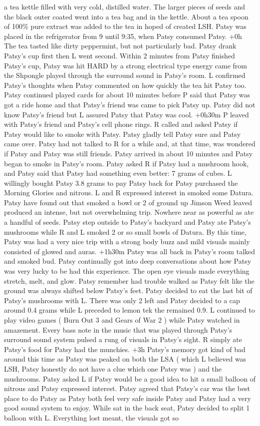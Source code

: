 \documentclass[12pt]{book}
\begin{document}
a tea kettle filled with very cold, distilled water. The larger pieces of seeds and the black outer coated went into a tea bag and in the kettle. About a tea spoon of 100\% pure extract was added to the tea in hoped of created LSH. Patsy was placed in the refrigerator from 9 until 9:35, when Patsy consumed Patsy. +0h The tea tasted like dirty peppermint, but not particularly bad. Patsy drank Patsy's cup first then L went second. Within 2 minutes from Patsy finished Patsy's cup, Patsy was hit HARD by a strong electrical type energy came from the Shpongle played through the surround sound in Patsy's room. L confirmed Patsy's thoughts when Patsy commented on how quickly the tea hit Patsy too. Patsy continued played cards for about 10 minutes before P said that Patsy was got a ride home and that Patsy's friend was came to pick Patsy up. Patsy did not know Patsy's friend but L assured Patsy that Patsy was cool. +0h30m P leaved with Patsy's friend and Patsy's cell phone rings. R called and asked Patsy if Patsy would like to smoke with Patsy. Patsy gladly tell Patsy sure and Patsy came over. Patsy had not talked to R for a while and, at that time, was wondered if Patsy and Patsy was still friends. Patsy arrived in about 10 minutes and Patsy began to smoke in Patsy's room. Patsy asked R if Patsy had a mushroom hook, and Patsy said that Patsy had something even better: 7 grams of cubes. L willingly bought Patsy 3.8 grams to pay Patsy back for Patsy purchased the Morning Glories and nitrous. L and R expressed interest in smoked some Datura. Patsy have found out that smoked a bowl or 2 of ground up Jimson Weed leaved produced an intense, but not overwhelming trip. Nowhere near as powerful as ate a handful of seeds. Patsy step outside to Patsy's backyard and Patsy ate Patsy's mushrooms while R and L smoked 2 or so small bowls of Datura. By this time, Patsy was had a very nice trip with a strong body buzz and mild visuals mainly consisted of glowed and auras. +1h30m Patsy was all back in Patsy's room talked and smoked bud. Patsy continually got into deep conversations about how Patsy was very lucky to be had this experience. The open eye visuals made everything stretch, melt, and glow. Patsy remember had trouble walked as Patsy felt like the ground was always shifted below Patsy's feet. Patsy decided to eat the last bit of Patsy's mushrooms with L. There was only 2 left and Patsy decided to a cap around 0.4 grams while L preceded to lemon tek the remained 0.9. L continued to play video games ( Burn Out 3 and Gears of War 2 ) while Patsy watched in amazement. Every bass note in the music that was played through Patsy's surround sound system pulsed a rung of visuals in Patsy's sight. R simply ate Patsy's food for Patsy had the munchies. +3h Patsy's memory got kind of bad around this time as Patsy was peaked on both the LSA ( which L believed was LSH, Patsy honestly do not have a clue which one Patsy was ) and the mushrooms. Patsy asked L if Patsy would be a good idea to hit a small balloon of nitrous and Patsy expressed interest. Patsy agreed that Patsy's car was the best place to do Patsy as Patsy both feel very safe inside Patsy and Patsy had a very good sound system to enjoy. While sat in the back seat, Patsy decided to split 1 balloon with L. Everything lost meant, the visuals got so 
\end{document}
